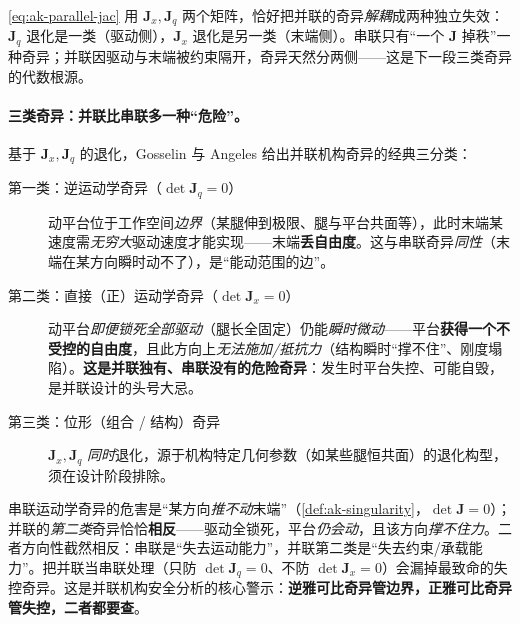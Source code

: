 \begin{insight}\label{ins:ak-parallel-twojac}
\cref{eq:ak-parallel-jac} 用 $\mathbf{J}_x,\mathbf{J}_q$ 两个矩阵，恰好把并联的奇异\emph{解耦}成两种独立失效\cite{gosselin1990singularity}：$\mathbf{J}_q$ 退化是一类（驱动侧），$\mathbf{J}_x$ 退化是另一类（末端侧）。串联只有“一个 $\mathbf{J}$ 掉秩”一种奇异；并联因驱动与末端被约束隔开，奇异天然分两侧——这是下一段三类奇异的代数根源。
\end{insight}

\paragraph{三类奇异：并联比串联多一种“危险”。}
基于 $\mathbf{J}_x,\mathbf{J}_q$ 的退化，Gosselin 与 Angeles 给出并联机构奇异的经典三分类\cite{gosselin1990singularity}：

\begin{description}
  \item[第一类：逆运动学奇异（$\det\mathbf{J}_q=0$）] 动平台位于工作空间\emph{边界}（某腿伸到极限、腿与平台共面等），此时末端某速度需\emph{无穷大}驱动速度才能实现——末端\textbf{丢自由度}。这与串联奇异\emph{同性}（末端在某方向瞬时动不了），是“能动范围的边”。
  \item[第二类：直接（正）运动学奇异（$\det\mathbf{J}_x=0$）] 动平台\emph{即便锁死全部驱动}（腿长全固定）仍能\emph{瞬时微动}——平台\textbf{获得一个不受控的自由度}，且此方向上\emph{无法施加/抵抗力}（结构瞬时“撑不住”、刚度塌陷）。\textbf{这是并联独有、串联没有的危险奇异}：发生时平台失控、可能自毁，是并联设计的头号大忌。
  \item[第三类：位形（组合 / 结构）奇异] $\mathbf{J}_x,\mathbf{J}_q$ \emph{同时}退化，源于机构特定几何参数（如某些腿恒共面）的退化构型，须在设计阶段排除。
\end{description}

\begin{pitfall}
串联运动学奇异的危害是“某方向\emph{推不动}末端”（\cref{def:ak-singularity}，$\det\mathbf{J}=0$）；并联的\emph{第二类}奇异恰恰\textbf{相反}——驱动全锁死，平台\emph{仍会动}，且该方向\emph{撑不住力}。二者方向性截然相反：串联是“失去运动能力”，并联第二类是“失去约束/承载能力”。把并联当串联处理（只防 $\det\mathbf{J}_q=0$、不防 $\det\mathbf{J}_x=0$）会漏掉最致命的失控奇异。这是并联机构安全分析的核心警示：\textbf{逆雅可比奇异管边界，正雅可比奇异管失控，二者都要查}。
\end{pitfall}

